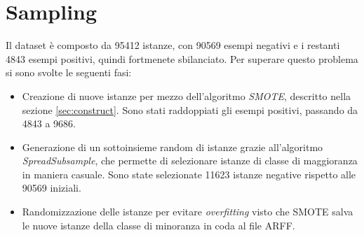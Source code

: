 \section{Sampling}
\label{sec:sampling}
%
Il dataset è composto da 95412 istanze, con 90569 esempi negativi e i restanti 4843 esempi positivi, quindi fortmenete sbilanciato. Per superare questo problema si sono svolte le seguenti fasi:
\begin{itemize}
	\item Creazione di nuove istanze per mezzo dell'algoritmo \textit{SMOTE}\cite{Chawla02smote:synthetic}, descritto nella sezione \ref{sec:construct}. Sono stati raddoppiati gli esempi positivi, passando da 4843 a 9686.
	\item Generazione di un sottoinsieme random di istanze grazie all'algoritmo \textit{SpreadSubsample}, che permette di selezionare istanze di classe di maggioranza in maniera casuale. Sono state selezionate 11623 istanze negative rispetto alle 90569 iniziali.
	\item Randomizzazione delle istanze per evitare \textit{overfitting} visto che SMOTE salva le nuove istanze della classe di minoranza in coda al file ARFF.
\end{itemize}

